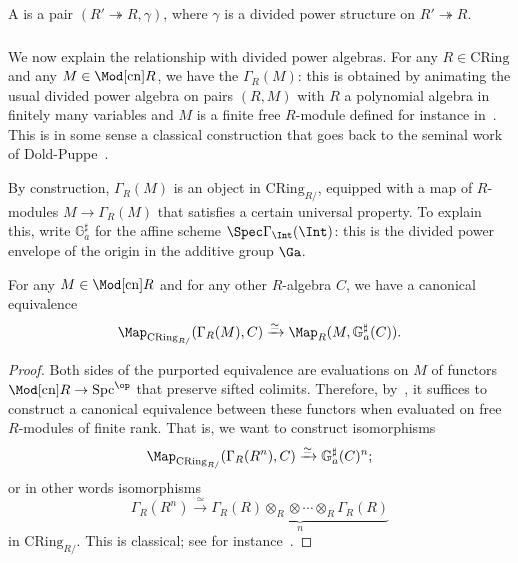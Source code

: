 \documentclass[10pt]{amsart}
\begin{document}
\begin{definition}
A  is a pair $(R'\twoheadrightarrow R,\gamma)$, where $\gamma$ is a divided power structure on $R'\twoheadrightarrow R$.
\end{definition}



\subsubsection{}
We now explain the relationship with divided power algebras. For any $R\in \mathrm{CRing}$ and any $M\in \Mod[\mathrm{cn}]{R}$, we have the  $\Gamma_R(M)$: this is obtained by animating the usual divided power algebra on pairs $(R,M)$ with $R$ a polynomial algebra in finitely many variables and $M$ is a finite free $R$-module defined for instance in~\cite[App. A]{berthelot_ogus:notes}. This is in some sense a classical construction that goes back to the seminal work of Dold-Puppe~\cite{MR0150183}. 

By construction, $\Gamma_R(M)$ is an object in $\mathrm{CRing}_{R/}$, equipped with a map of $R$-modules $M\to \Gamma_R(M)$ that satisfies a certain universal property. To explain this, write $\mathbb{G}_a^\sharp$ for the affine scheme $\Spec\Gamma_{\Int}(\Int)$: this is the divided power envelope of the origin in the additive group $\Ga$. 
\begin{lemma}
\label{lem:divided_powers_univ}
For any $M\in\Mod[\mathrm{cn}]{R}$ and for any other $R$-algebra $C$, we have a canonical equivalence
\[
\Map_{\mathrm{CRing}_{R/}}(\Gamma_R(M),C)\xrightarrow{\simeq}\Map_{{R}}(M,\mathbb{G}_a^\sharp(C)).
\]
\end{lemma}
\begin{proof}
Both sides of the purported equivalence are evaluations on $M$ of functors $\Mod[\mathrm{cn}]{R}\to \mathrm{Spc}^{\op}$ that preserve sifted colimits. Therefore, by~\cite[Prop. 5.5.8.15]{Lurie2009-oc}, it suffices to construct a canonical equivalence between these functors when evaluated on free $R$-modules of finite rank. That is, we want to construct isomorphisms
\[
\Map_{\mathrm{CRing}_{R/}}(\Gamma_R(R^n),C)\xrightarrow{\simeq}\mathbb{G}_a^\sharp(C)^n;
\]
or in other words isomorphisms
\[
\Gamma_R(R^n)\xrightarrow{\simeq}\underbrace{\Gamma_R(R)\otimes_R\otimes\cdots\otimes_R\Gamma_R(R)}_{n}
\]
in $\mathrm{CRing}_{R/}$. This is classical; see for instance~\cite[Prop. (A2)]{berthelot_ogus:notes}.

\end{proof} 
\end{document}
